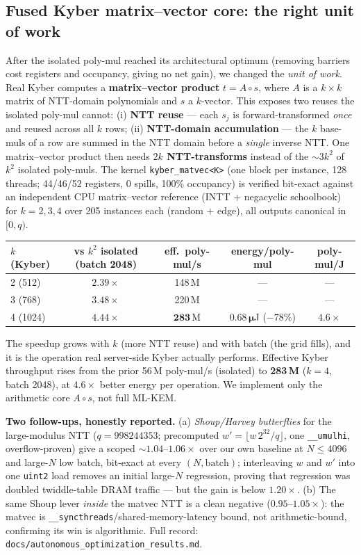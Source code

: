 \documentclass[11pt,a4paper]{article}
\begin{document}
\subsection{Fused Kyber matrix--vector core: the right unit of work}
After the isolated poly-mul reached its architectural optimum (removing barriers cost registers and
occupancy, giving no net gain), we changed the \emph{unit of work}. Real Kyber computes a
\textbf{matrix--vector product} $t = A\circ s$, where $A$ is a $k\times k$ matrix of NTT-domain
polynomials and $s$ a $k$-vector. This exposes two reuses the isolated poly-mul cannot: (i)
\textbf{NTT reuse} --- each $s_j$ is forward-transformed \emph{once} and reused across all $k$ rows;
(ii) \textbf{NTT-domain accumulation} --- the $k$ base-muls of a row are summed in the NTT domain
before a \emph{single} inverse NTT. One matrix--vector product then needs \textbf{$2k$ NTT-transforms}
instead of the ${\sim}3k^2$ of $k^2$ isolated poly-muls. The kernel \texttt{kyber\_matvec<K>} (one block
per instance, 128 threads; 44/46/52 registers, 0 spills, 100\% occupancy) is verified bit-exact against
an independent CPU matrix--vector reference (INTT $+$ negacyclic schoolbook) for $k=2,3,4$ over 205
instances each (random $+$ edge), all outputs canonical in $[0,q)$.

\begin{center}
\begin{tabular}{lcccc}
\hline
$k$ (Kyber) & vs $k^2$ isolated (batch 2048) & eff.\ poly-mul/s & energy/poly-mul & poly-mul/J \\
\hline
2 (512)  & $2.39\times$ & 148\,M & --- & --- \\
3 (768)  & $3.48\times$ & 220\,M & --- & --- \\
4 (1024) & $\mathbf{4.44\times}$ & $\mathbf{283}$\,M & $\mathbf{0.68\,\mu}$J ($-78\%$) & $4.6\times$ \\
\hline
\end{tabular}
\end{center}

The speedup grows with $k$ (more NTT reuse) and with batch (the grid fills), and it is the operation
real server-side Kyber actually performs. Effective Kyber throughput rises from the prior 56\,M
poly-mul/s (isolated) to \textbf{283\,M} ($k{=}4$, batch 2048), at $4.6\times$ better energy per
operation. We implement only the arithmetic core $A\circ s$, not full ML-KEM.

\textbf{Two follow-ups, honestly reported.} (a) \emph{Shoup/Harvey butterflies} for the large-modulus
NTT ($q=998244353$; precomputed $w'=\lfloor w\,2^{32}/q\rfloor$, one \texttt{\_\_umulhi}, overflow-proven)
give a scoped $\sim\!1.04$--$1.06\times$ over our own baseline at $N\le 4096$ and large-$N$ low batch,
bit-exact at every $(N,\text{batch})$; interleaving $w$ and $w'$ into one \texttt{uint2} load removes an
initial large-$N$ regression, proving that regression was doubled twiddle-table DRAM traffic --- but the
gain is below $1.20\times$. (b) The same Shoup lever \emph{inside} the matvec NTT is a clean negative
($0.95$--$1.05\times$): the matvec is \texttt{\_\_syncthreads}/shared-memory-latency bound, not
arithmetic-bound, confirming its win is algorithmic. Full record:
\texttt{docs/autonomous\_optimization\_results.md}.
\end{document}
